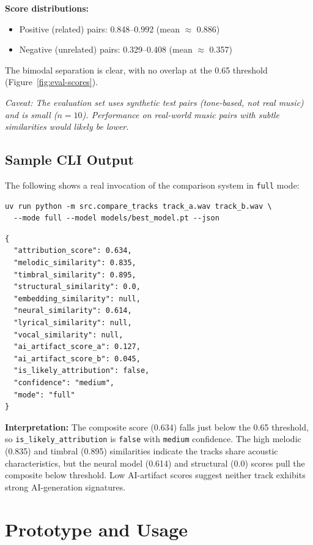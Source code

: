 \documentclass[11pt,a4paper]{article}
\begin{document}
\textbf{Score distributions:}
\begin{itemize}[nosep]
  \item Positive (related) pairs: 0.848--0.992 (mean $\approx$ 0.886)
  \item Negative (unrelated) pairs: 0.329--0.408 (mean $\approx$ 0.357)
\end{itemize}

\noindent
The bimodal separation is clear, with no overlap at the 0.65 threshold (Figure~\ref{fig:eval-scores}).

\textit{Caveat: The evaluation set uses synthetic test pairs (tone-based, not real music) and is small ($n=10$). Performance on real-world music pairs with subtle similarities would likely be lower.}

\subsection{Sample CLI Output}

The following shows a real invocation of the comparison system in \texttt{full} mode:

\begin{Verbatim}[fontsize=\small]
uv run python -m src.compare_tracks track_a.wav track_b.wav \
  --mode full --model models/best_model.pt --json
\end{Verbatim}

\begin{Verbatim}[fontsize=\small]
{
  "attribution_score": 0.634,
  "melodic_similarity": 0.835,
  "timbral_similarity": 0.895,
  "structural_similarity": 0.0,
  "embedding_similarity": null,
  "neural_similarity": 0.614,
  "lyrical_similarity": null,
  "vocal_similarity": null,
  "ai_artifact_score_a": 0.127,
  "ai_artifact_score_b": 0.045,
  "is_likely_attribution": false,
  "confidence": "medium",
  "mode": "full"
}
\end{Verbatim}

\noindent
\textbf{Interpretation:} The composite score (0.634) falls just below the 0.65 threshold, so \texttt{is\_likely\_attribution} is \texttt{false} with \texttt{medium} confidence. The high melodic (0.835) and timbral (0.895) similarities indicate the tracks share acoustic characteristics, but the neural model (0.614) and structural (0.0) scores pull the composite below threshold. Low AI-artifact scores suggest neither track exhibits strong AI-generation signatures.


\section{Prototype and Usage}
\end{document}
